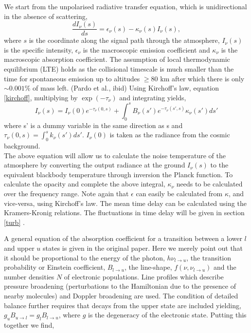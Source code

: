 We start from the unpolarised radiative transfer equation, which is unidirectional in the absence of scattering,
\begin{equation}
\frac{dI_\nu (s) }{ds} = \epsilon_\nu(s) -\kappa_\nu(s)  I_\nu (s),
\end{equation}\label{eq:rad_trans}
where $s$ is the coordinate along the signal path through the atmosphere, $I_\nu(s)$ is the specific intensity, $\epsilon_\nu$ is the macroscopic emission coefficient and $\kappa_\nu$ is the macroscopic absorption coefficient.  The assumption of local thermodynamic equilibrium (LTE) holds as the collisional timescale is much smaller than the time for spontaneous emission up to altitudes $\ge 80$ km after which there is only $\sim 0.001\%$ of mass left. (Pardo et al., ibid) Using Kirchoff's law, equation \ref{kirchoff}, multiplying by $\exp(-\tau_\nu)$ and integrating yields, 
\begin{equation}
I_\nu(s) = I_\nu(0) e^{-\tau_\nu (0,s) }+ \int_0^s B_\nu(s')e^{-\tau_\nu (s',s) }\kappa_\nu(s')ds'
\end{equation}
where  s' is a dummy variable in the same direction as s and $\tau_\nu (0,s) = \int_0^{s} k_\nu(s')ds'$. $I_\nu(0)$ is taken as the radiance from the cosmic background.\\
The above equation will allow us to calculate the noise temperature of the atmosphere by converting the output radiance at the ground $I_\nu(s)$ to  the equivalent blackbody temperature through inversion the Planck function. To calculate the opacity and complete the above integral, $\kappa_\nu$ needs to be calculated over the frequency range. Note again that  $\epsilon$ can easily be calculated from $\kappa$, and vice-versa, using Kirchoff's law.  The mean time delay can be calculated using the Kramers-Kronig relations. The fluctuations in time delay will be given in section \ref{turb} .



A general equation of the absorption coefficient for a transition between a lower $l$ and upper $u$ states is given in the original paper. Here we merely point out that it should be proportional to the energy of the photon, $h\nu_{l \to u}$, the transition probability or Einstein coefficient, $ B_{l \to u}$, the line-shape, $f(\nu,\nu_{l \to u})$ and the number densities $N$ of electronic populations. Line profiles which describe pressure broadening (perturbations to the Hamiltonian due to the presence of nearby molecules) and Doppler broadening are used. The condition of detailed balance further requires that decays from the upper state are included yielding, $g_u B_{u \to l} =g_l B_{l \to u}$, where $g$ is the degeneracy of the electronic state. Putting this together we find,

